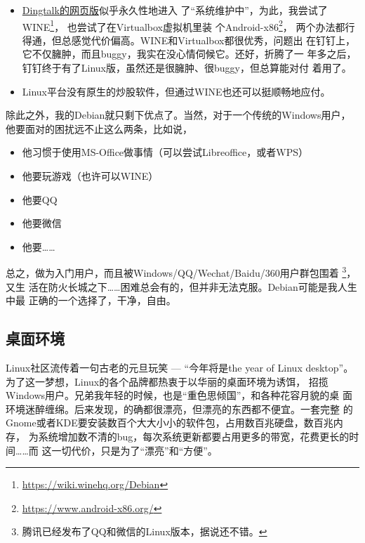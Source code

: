 \begin{itemize}
\item \href{https://im.dingtalk.com}{Dingtalk的网页版}似乎永久性地进入
  了“系统维护中”，为此，我尝试了WINE\footnote{\url{https://wiki.winehq.org/Debian}}，%
  也尝试了在Virtualbox虚拟机里装
  个Android-x86\footnote{\url{https://www.android-x86.org/}}，%
  两个办法都行得通，但总感觉代价偏高。WINE和Virtualbox都很优秀，问题出
  在钉钉上，它不仅臃肿，而且buggy，我实在没心情伺候它。还好，折腾了一
  年多之后，钉钉终于有了Linux版，虽然还是很臃肿、很buggy，但总算能对付
  着用了。
\item Linux平台没有原生的炒股软件，但通过WINE也还可以挺顺畅地应付。
\end{itemize}

除此之外，我的Debian就只剩下优点了。当然，对于一个传统的Windows用户，
他要面对的困扰远不止这么两条，比如说，

\begin{itemize}
\item 他习惯于使用MS-Office做事情（可以尝试Libreoffice，或者WPS）
\item 他要玩游戏（也许可以WINE）
\item 他要QQ
\item 他要微信
\item 他要……
\end{itemize}


总之，做为入门用户，而且被Windows/QQ/Wechat/Baidu/360用户群包围着
\footnote{腾讯已经发布了QQ和微信的Linux版本，据说还不错。}，又生
活在防火长城之下……困难总会有的，但并非无法克服。Debian可能是我人生中最
正确的一个选择了，干净，自由。

\subsection{桌面环境}

Linux社区流传着一句古老的元旦玩笑 --- “今年将是the year of Linux
desktop”。为了这一梦想，Linux的各个品牌都热衷于以华丽的桌面环境为诱饵，
招揽Windows用户。兄弟我年轻的时候，也是“重色思倾国”，和各种花容月貌的桌
面环境迷醉缠绵。后来发现，的确都很漂亮，但漂亮的东西都不便宜。一套完整
的Gnome或者KDE要安装数百个大大小小的软件包，占用数百兆硬盘，数百兆内存，
为系统增加数不清的bug，每次系统更新都要占用更多的带宽，花费更长的时间……而
这一切代价，只是为了“漂亮”和“方便”。

